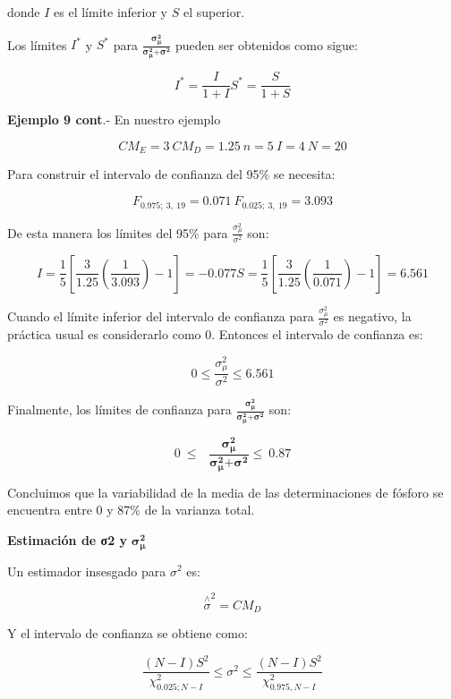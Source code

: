 \documentclass[]{book}
\theoremstyle{definition}
\theoremstyle{definition}
\theoremstyle{definition}
\theoremstyle{remark}
\begin{document}
donde \(I\) es el límite inferior y \(S\) el superior.

Los límites \(I^{*}\) y \(S^{*}\) para
\(\frac{\mathbf{\sigma}_{\mathbf{\mu}}^{\mathbf{2}}}{\mathbf{\sigma}_{\mathbf{\mu}}^{\mathbf{2}}\mathbf{+}\mathbf{\sigma}^{\mathbf{2}}}\)
pueden ser obtenidos como sigue:

\[
I^{*} = \frac{I}{1 + I}S^{*} = \frac{S}{1 + S}
\]

\textbf{Ejemplo 9 cont}.- En nuestro ejemplo

\[
CM_E = 3\ CM_D = 1.25\ n = 5\ I = 4\ N = 20
\]

Para construir el intervalo de confianza del 95\% se necesita:

\[
F_{0.975;\ 3,\ 19} = 0.071\ F_{0.025;\ 3,\ 19} = 3.093
\]

De esta manera los límites del 95\% para
\(\frac{\sigma_{\mu}^{2}}{\sigma^{2}}\) son:

\[
I = \frac{1}{5}\left\lbrack \frac{3}{1.25}\left( \frac{1}{3.093} \right) - 1 \right\rbrack = - 0.077S = \frac{1}{5}\left\lbrack \frac{3}{1.25}\left( \frac{1}{0.071} \right) - 1 \right\rbrack = 6.561
\]

Cuando el límite inferior del intervalo de confianza para
\(\frac{\sigma_{\mu}^{2}}{\sigma^{2}}\) es negativo, la práctica usual
es considerarlo como 0. Entonces el intervalo de confianza es:

\[
0 \leq \frac{\sigma_{\mu}^{2}}{\sigma^{2}} \leq 6.561
\]

Finalmente, los límites de confianza para
\(\frac{\mathbf{\sigma}_{\mathbf{\mu}}^{\mathbf{2}}}{\mathbf{\sigma}_{\mathbf{\mu}}^{\mathbf{2}}\mathbf{+}\mathbf{\sigma}^{\mathbf{2}}}\)
son:

\[
0\  \leq \text{  }\frac{\mathbf{\sigma}_{\mathbf{\mu}}^{\mathbf{2}}}{\mathbf{\sigma}_{\mathbf{\mu}}^{\mathbf{2}}\mathbf{+}\mathbf{\sigma}^{\mathbf{2}}} \leq \ 0.87
\]

Concluimos que la variabilidad de la media de las determinaciones de
fósforo se encuentra entre 0 y 87\% de la varianza total.

\textbf{Estimación de σ2 y}
\(\mathbf{\sigma}_{\mathbf{\mu}}^{\mathbf{2}}\)

Un estimador insesgado para \(\sigma^{2}\) es:

\[
{\overset{\land}{\sigma}}^{2} = CM_D
\]

Y el intervalo de confianza se obtiene como:

\[
\frac{\left( N - I \right)S^{2}}{\chi_{0.025;N - I}^{2}} \leq \sigma^{2} \leq \frac{\left( N - I \right)S^{2}}{\chi_{0.975,N - I}^{2}}
\]
\end{document}
